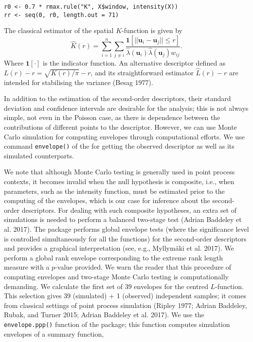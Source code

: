 \begin{verbatim}
r0 <- 0.7 * rmax.rule("K", X$window, intensity(X))
rr <- seq(0, r0, length.out = 71)
\end{verbatim}

The classical estimator of the spatial \(K\)-function is given by
\begin{equation*}
    \hat{K}(r)= \sum_{i=1}^n \sum_{j \neq i}
    \frac{\mathbf{1}\left[|| \mathbf{u}_{i}-\mathbf{u}_{j} || \leq r\right]}{\hat{\lambda}(\mathbf{u}_{i}) \hat{\lambda} (\mathbf{u}_{j}) w_{ij}}.
    \label{eq:Kstimatormoller}
\end{equation*}
Where \(\mathbf{1}[\cdot]\) is the indicator function. An alternative descriptor defined as \(L(r)-r= \sqrt{K(r) / \pi}-r\), and its straightforward estimator \(\hat{L}(r)-r\) are intended for stabilising the variance (Besag 1977).

In addition to the estimation of the second-order descriptors, their standard deviation and confidence intervals are desirable for the analysis; this is not always simple, not even in the Poisson case, as there is dependence between the contributions of different points to the descriptor. However, we can use Monte Carlo simulation for computing envelopes through computational efforts. We use command \texttt{envelope()} of the  for getting the observed descriptor as well as its simulated counterparts.

We note that although Monte Carlo testing is generally used in point process contexts, it becomes invalid when the null hypothesis is composite, i.e., when parameters, such as the intensity function, must be estimated prior to the computing of the envelopes, which is our case for inference about the second-order descriptors. For dealing with such composite hypotheses, an extra set of simulations is needed to perform a balanced two-stage test (Adrian Baddeley et al. 2017). The  package performs global envelope tests (where the significance level is controlled simultaneously for all the functions) for the second-order descriptors and provides a graphical interpretation (see, e.g., Myllymäki et al. 2017). We perform a global rank envelope corresponding to the extreme rank length measure with a \(p\)-value provided. We warn the reader that this procedure of computing envelopes and two-stage Monte Carlo testing is computationally demanding. We calculate the first set of \(39\) envelopes for the centred \(L\)-function. This selection gives 39 (simulated) + 1 (observed) independent samples; it comes from classical settings of point process simulation (Ripley 1977; Adrian Baddeley, Rubak, and Turner 2015; Adrian Baddeley et al. 2017). We use the \texttt{envelope.ppp()} function of the  package; this function computes simulation envelopes of a summary function,

